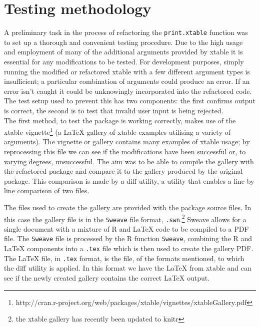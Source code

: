 \documentclass{memoir}\usepackage[]{graphicx}\usepackage[]{color}
\newcommand{\pkg}[1]{{\fontseries{b}\selectfont #1}}
\let\code=\texttt
\newcommand{\latex}{\LaTeX\xspace}
\begin{document}
\section{Testing methodology}

A preliminary task in the process of refactoring the \code{print.xtable} function was to set up a thorough and convenient testing procedure. Due to the high usage and employment of many of the additional arguments provided by \pkg{xtable} it is essential for any modifications to be tested. For development purposes, simply running the modified or refactored \pkg{xtable} with a few different argument types is insufficient; a particular combination of arguments could produce an error. If an error isn't caught it could be unknowingly incorporated into the refactored code. The test setup used to prevent this has two components: the first confirms output is correct, the second is to test that invalid user input is being rejected.\\ 


The first method, to test the package is working correctly, makes use of the \pkg{xtable} vignette\footnote{http://cran.r-project.org/web/packages/xtable/vignettes/xtableGallery.pdf} (a \latex gallery of \pkg{xtable} examples utilising a variety of arguments). The vignette or gallery contains many examples of \pkg{xtable} usage; by reprocessing this file we can see if the modifications have been successful or, to varying degrees, unsuccessful. The aim was to be able to compile the gallery with the refactored package and compare it to the gallery produced by the original package. This comparison is made by a diff utility, a utility that enables a line by line comparison of two files.

The files used to create the gallery are provided with the package source files. In this case the gallery file is in the \code{Sweave} file format, \code{.swn}.\footnote{the \pkg{xtable} gallery has recently been updated to \pkg{knitr}} Sweave allows for a single document with a mixture of R and \latex code to be compiled to a PDF file. The \code{Sweave} file is processed by the R function \code{Sweave}, combining the R and \latex components into a \code{.tex} file which is then used to create the gallery PDF. The \latex file, in \code{.tex} format, is the file, of the formats mentioned, to which the diff utility is applied. In this format we have the \latex from \pkg{xtable} and can see if the newly created gallery contains the correct \latex output. 
\end{document}
